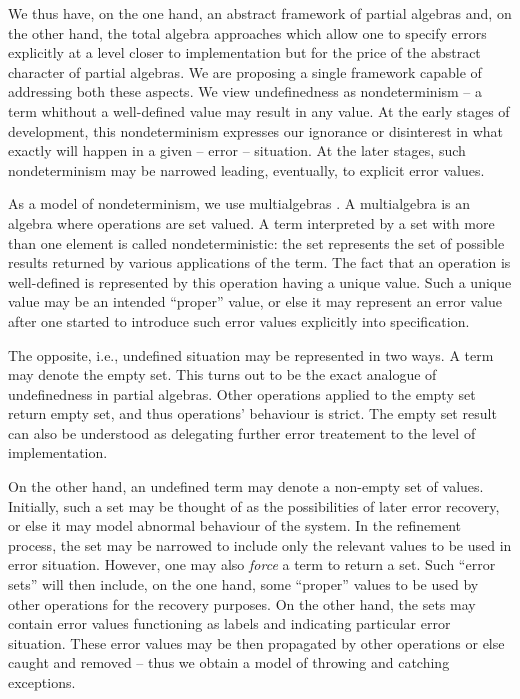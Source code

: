 \documentclass[10pt]{article}
\begin{document}
We thus have, on the one hand, an abstract framework of partial algebras and,
on the other hand, the total algebra approaches which allow one to specify
errors explicitly at a level closer to implementation but for the price
 of the abstract character of partial algebras.
We are proposing a single framework capable of addressing both these
aspects. 
We view undefinedness as nondeterminism -- a term whithout a
well-defined value may result in any value. At the early stages of
development, this nondeterminism expresses our ignorance or disinterest in
what exactly will happen in a given -- error -- situation. At the later
stages, such nondeterminism may be narrowed leading, eventually, to explicit
error values. 

As a model of nondeterminism, we use multialgebras \cite{calc,multi}.
A multialgebra is an algebra where operations are set valued. A term
interpreted by a set with more than one element is called nondeterministic:
the set represents the set of possible results returned by various
applications of the term. 
The fact that an operation is well-defined is represented by this operation
having a unique value. Such a unique value may be an intended ``proper''
value, or else it may represent an error value after one started to introduce
such error values explicitly into specification.

The opposite, i.e., undefined situation may be represented in two ways. A
term may denote the empty set. This turns out to be the exact analogue of
undefinedness in partial algebras. Other operations applied to the empty set
return empty set, and thus operations' behaviour is strict. The empty set
result can also
be understood as delegating further error treatement to the level of
implementation. 

On the other hand, an undefined term may denote a non-empty set of
values. Initially, such a set may be thought of as the possibilities of later
error recovery, or else it may model abnormal behaviour of the system. In the
refinement process, the set may be narrowed to include only the relevant
values to be used in error situation. However, one may also {\em force} a
term to return a set. Such ``error sets'' will then include, on the one hand,
some ``proper'' values to be used by other operations for the recovery
purposes. On the other hand, the sets may contain error values functioning as
labels and indicating particular error situation. These error values may be
then propagated by other operations or else caught and removed -- thus we
obtain a model of throwing and catching exceptions.
\end{document}

